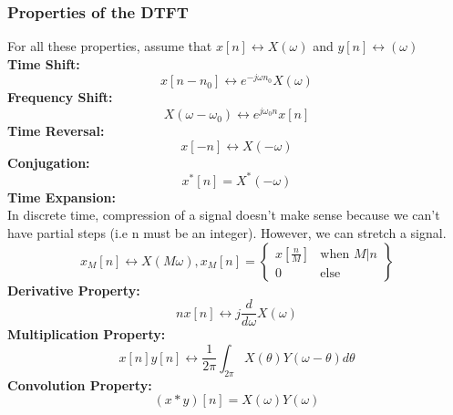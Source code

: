 \documentclass{article}
\begin{document}
\subsubsection{Properties of the DTFT}
For all these properties, assume that $x[n] \leftrightarrow X(\omega)$ and $y[n]\leftrightarrow (\omega)$\\
\textbf{Time Shift: }
$$ x[n-n_0] \leftrightarrow e^{-j\omega n_0}X(\omega)$$
\textbf{Frequency Shift: }
$$ X(\omega - \omega_0) \leftrightarrow e^{j\omega_0 n}x[n]$$
\textbf{Time Reversal: }
$$ x[-n] \leftrightarrow X(-\omega)$$
\textbf{Conjugation: }
$$ x^*[n] = X^*(-\omega)$$
\textbf{Time Expansion: }\\
In discrete time, compression of a signal doesn't make sense because we can't have partial steps (i.e n must be an integer).
However, we can stretch a signal.
\[
    x_M[n] \leftrightarrow X(M\omega), x_M[n] = \left\{
        \begin{array}{cc}
            x[\frac{n}{M}] & \text{when } M | n\\
            0 & \text{else}
        \end{array}
    \right\}
\]
\textbf{Derivative Property: }
$$nx[n] \leftrightarrow j \frac{d}{d\omega}X(\omega)$$
\textbf{Multiplication Property: }
$$ x[n]y[n] \leftrightarrow \frac{1}{2\pi}\int_{2\pi}{X(\theta)Y(\omega-\theta)d\theta}$$
\textbf{Convolution Property: }
$$(x*y)[n] = X(\omega)Y(\omega)$$
\end{document}
